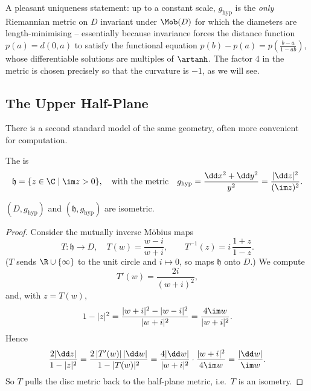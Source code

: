 \begin{remark}
    A pleasant uniqueness statement: up to a constant scale, $g_{\mathrm{hyp}}$ is the \emph{only} Riemannian metric on $D$ invariant under $\Mob(D)$ for which the diameters are length-minimising -- essentially because invariance forces the distance function $p(a) = d(0, a)$ to satisfy the functional equation $p(b) - p(a) = p\left(\frac{b - a}{1 - ab}\right)$, whose differentiable solutions are multiples of $\artanh$. The factor $4$ in the metric is chosen precisely so that the curvature is $-1$, as we will see.
\end{remark}

\subsection{The Upper Half-Plane}

There is a second standard model of the same geometry, often more convenient for computation.

\begin{definition}
    The  is
    $$
    \mathfrak{h} = \{z \in \C \mid \im z > 0\}, \quad \text{with the metric} \quad g_{\mathrm{hyp}} = \frac{\dd x^2 + \dd y^2}{y^2} = \frac{|\dd z|^2}{(\im z)^2}.
    $$
\end{definition}

\begin{lemma}
    $(D, g_{\mathrm{hyp}})$ and $(\mathfrak{h}, g_{\mathrm{hyp}})$ are isometric.
\end{lemma}
\begin{proof}
    Consider the mutually inverse M\"obius maps
    $$
    T: \mathfrak{h} \rightarrow D, \quad T(w) = \frac{w - i}{w + i}, \qquad T^{-1}(z) = i\,\frac{1 + z}{1 - z}.
    $$
    ($T$ sends $\R \cup \{\infty\}$ to the unit circle and $i \mapsto 0$, so maps $\mathfrak{h}$ onto $D$.) We compute
    $$
    T'(w) = \frac{2i}{(w + i)^2},
    $$
    and, with $z = T(w)$,
    $$
    1 - |z|^2 = \frac{|w + i|^2 - |w - i|^2}{|w+i|^2} = \frac{4 \im w}{|w + i|^2}.
    $$
    Hence
    $$
    \frac{2|\dd z|}{1 - |z|^2} = \frac{2\,|T'(w)|\,|\dd w|}{1 - |T(w)|^2} = \frac{4 |\dd w|}{|w+i|^2} \cdot \frac{|w+i|^2}{4 \im w} = \frac{|\dd w|}{\im w}.
    $$
    So $T$ pulls the disc metric back to the half-plane metric, i.e.\ $T$ is an isometry.
\end{proof}

